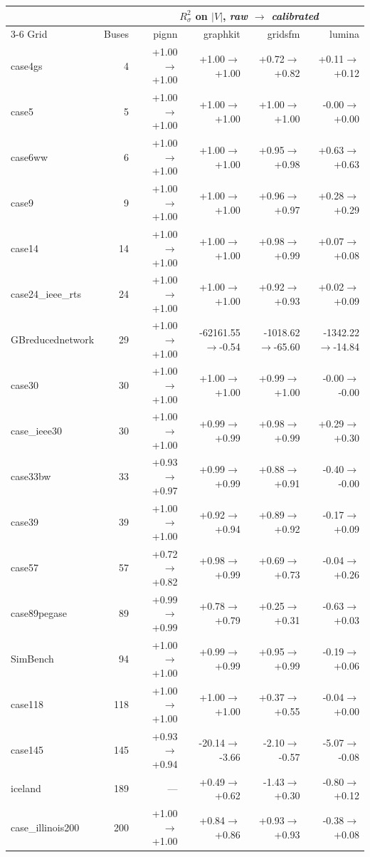 \documentclass[10pt]{article}
\begin{document}
\begin{longtable}{lrrrrr}
\toprule
& & \multicolumn{4}{c}{$R^2_{\sigma}$ on $|V|$, \emph{raw $\to$ calibrated}} \\
\cmidrule(lr){3-6}
Grid & Buses & pignn & graphkit & gridsfm & lumina \\
\midrule
\endhead
case4gs & 4 & +1.00$\to$+1.00 & +1.00$\to$+1.00 & +0.72$\to$+0.82 & +0.11$\to$+0.12 \\
case5 & 5 & +1.00$\to$+1.00 & +1.00$\to$+1.00 & +1.00$\to$+1.00 & -0.00$\to$+0.00 \\
case6ww & 6 & +1.00$\to$+1.00 & +1.00$\to$+1.00 & +0.95$\to$+0.98 & +0.63$\to$+0.63 \\
case9 & 9 & +1.00$\to$+1.00 & +1.00$\to$+1.00 & +0.96$\to$+0.97 & +0.28$\to$+0.29 \\
case14 & 14 & +1.00$\to$+1.00 & +1.00$\to$+1.00 & +0.98$\to$+0.99 & +0.07$\to$+0.08 \\
case24\_ieee\_rts & 24 & +1.00$\to$+1.00 & +1.00$\to$+1.00 & +0.92$\to$+0.93 & +0.02$\to$+0.09 \\
GBreducednetwork & 29 & +1.00$\to$+1.00 & -62161.55$\to$-0.54 & -1018.62$\to$-65.60 & -1342.22$\to$-14.84 \\
case30 & 30 & +1.00$\to$+1.00 & +1.00$\to$+1.00 & +0.99$\to$+1.00 & -0.00$\to$-0.00 \\
case\_ieee30 & 30 & +1.00$\to$+1.00 & +0.99$\to$+0.99 & +0.98$\to$+0.99 & +0.29$\to$+0.30 \\
case33bw & 33 & +0.93$\to$+0.97 & +0.99$\to$+0.99 & +0.88$\to$+0.91 & -0.40$\to$-0.00 \\
case39 & 39 & +1.00$\to$+1.00 & +0.92$\to$+0.94 & +0.89$\to$+0.92 & -0.17$\to$+0.09 \\
case57 & 57 & +0.72$\to$+0.82 & +0.98$\to$+0.99 & +0.69$\to$+0.73 & -0.04$\to$+0.26 \\
case89pegase & 89 & +0.99$\to$+0.99 & +0.78$\to$+0.79 & +0.25$\to$+0.31 & -0.63$\to$+0.03 \\
SimBench & 94 & +1.00$\to$+1.00 & +0.99$\to$+0.99 & +0.95$\to$+0.99 & -0.19$\to$+0.06 \\
case118 & 118 & +1.00$\to$+1.00 & +1.00$\to$+1.00 & +0.37$\to$+0.55 & -0.04$\to$+0.00 \\
case145 & 145 & +0.93$\to$+0.94 & -20.14$\to$-3.66 & -2.10$\to$-0.57 & -5.07$\to$-0.08 \\
iceland & 189 & --- & +0.49$\to$+0.62 & -1.43$\to$+0.30 & -0.80$\to$+0.12 \\
case\_illinois200 & 200 & +1.00$\to$+1.00 & +0.84$\to$+0.86 & +0.93$\to$+0.93 & -0.38$\to$+0.08 \\

\end{longtable}
\end{document}
